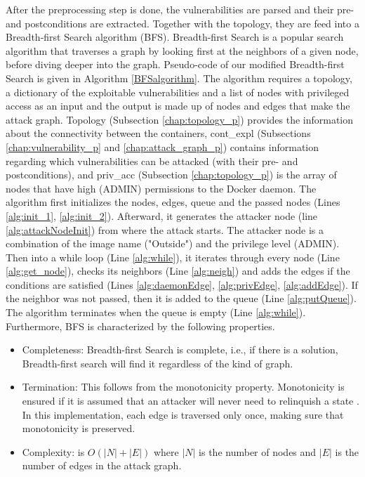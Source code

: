 After the preprocessing step is done, the vulnerabilities are parsed and their pre- and postconditions are extracted. Together with the topology, they are feed into a Breadth-first Search algorithm (BFS).
Breadth-first Search is a popular search algorithm that traverses a graph by looking first at the neighbors of a given node, before diving deeper into the graph. Pseudo-code of our modified Breadth-first Search is given in Algorithm \ref{BFSalgorithm}. The algorithm requires a topology, a dictionary of the exploitable vulnerabilities and a list of nodes with privileged access as an input and the output is made up of nodes and edges that make the attack graph. Topology (Subsection \ref{chap:topology_p}) provides the information about the connectivity between the containers, cont\_expl (Subsections \ref{chap:vulnerability_p} and \ref{chap:attack_graph_p}) contains information regarding which vulnerabilities can be attacked (with their pre- and postconditions), and priv\_acc (Subsection \ref{chap:topology_p}) is the array of nodes that have high (ADMIN) permissions to the Docker daemon. The algorithm first initializes the nodes, edges, queue and the passed nodes (Lines \ref{alg:init_1}, \ref{alg:init_2}). Afterward, it generates the attacker node (line \ref{alg:attackNodeInit}) from where the attack starts. The attacker node is a combination of the image name ("Outside") and the privilege level (ADMIN). Then into a while loop (Line \ref{alg:while}), it iterates through every node (Line \ref{alg:get_node}), checks its neighbors (Line \ref{alg:neigh}) and adds the edges if the conditions are satisfied (Lines \ref{alg:daemonEdge}, \ref{alg:privEdge}, \ref{alg:addEdge}). If the neighbor was not passed, then it is added to the queue (Line \ref{alg:putQueue}). The algorithm terminates when the queue is empty (Line \ref{alg:while}). Furthermore, BFS is characterized by the following properties.


\begin{itemize}
	\item Completeness: Breadth-first Search is complete, i.e., if there is a solution, Breadth-first search will find it regardless of the kind of graph.
	\item Termination: This follows from the monotonicity property. Monotonicity is ensured if it is assumed that an attacker will never need to relinquish a state \cite{ingols2006practical, ou2006scalable, ammann2002scalable}. In this implementation, each edge is traversed only once, making sure that monotonicity is preserved.
	\item  Complexity: is $O(|N| + |E|)$ where $|N|$ is the number of nodes and $|E|$ is the number of edges in the attack graph.
\end{itemize}


